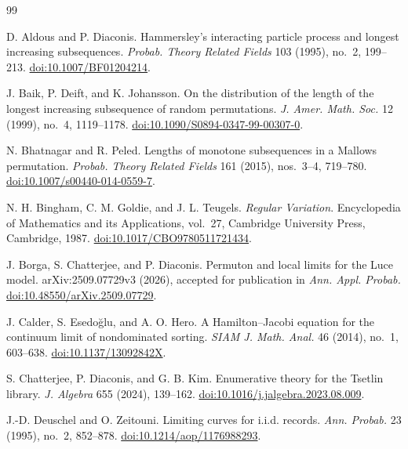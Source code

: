 \documentclass[11pt]{article}
\theoremstyle{remark}
\begin{document}
\begin{thebibliography}{99}

D. Aldous and P. Diaconis.
\newblock Hammersley's interacting particle process and longest increasing
subsequences.
\newblock \emph{Probab. Theory Related Fields} 103 (1995), no.~2, 199--213.
\newblock \href{https://doi.org/10.1007/BF01204214}{doi:10.1007/BF01204214}.

J. Baik, P. Deift, and K. Johansson.
\newblock On the distribution of the length of the longest increasing
subsequence of random permutations.
\newblock \emph{J. Amer. Math. Soc.} 12 (1999), no.~4, 1119--1178.
\newblock \href{https://doi.org/10.1090/S0894-0347-99-00307-0}
{doi:10.1090/S0894-0347-99-00307-0}.

N. Bhatnagar and R. Peled.
\newblock Lengths of monotone subsequences in a Mallows permutation.
\newblock \emph{Probab. Theory Related Fields} 161 (2015), nos.~3--4,
719--780.
\newblock \href{https://doi.org/10.1007/s00440-014-0559-7}
{doi:10.1007/s00440-014-0559-7}.

N. H. Bingham, C. M. Goldie, and J. L. Teugels.
\newblock \emph{Regular Variation}.
\newblock Encyclopedia of Mathematics and its Applications, vol.~27,
Cambridge University Press, Cambridge, 1987.
\newblock \href{https://doi.org/10.1017/CBO9780511721434}
{doi:10.1017/CBO9780511721434}.

J. Borga, S. Chatterjee, and P. Diaconis.
\newblock Permuton and local limits for the Luce model.
\newblock arXiv:2509.07729v3 (2026), accepted for publication in
\emph{Ann. Appl. Probab.}
\newblock \href{https://doi.org/10.48550/arXiv.2509.07729}
{doi:10.48550/arXiv.2509.07729}.

J. Calder, S. Esedo\u{g}lu, and A. O. Hero.
\newblock A Hamilton--Jacobi equation for the continuum limit of
nondominated sorting.
\newblock \emph{SIAM J. Math. Anal.} 46 (2014), no.~1, 603--638.
\newblock \href{https://doi.org/10.1137/13092842X}
{doi:10.1137/13092842X}.

S. Chatterjee, P. Diaconis, and G. B. Kim.
\newblock Enumerative theory for the Tsetlin library.
\newblock \emph{J. Algebra} 655 (2024), 139--162.
\newblock \href{https://doi.org/10.1016/j.jalgebra.2023.08.009}
{doi:10.1016/j.jalgebra.2023.08.009}.

J.-D. Deuschel and O. Zeitouni.
\newblock Limiting curves for i.i.d. records.
\newblock \emph{Ann. Probab.} 23 (1995), no.~2, 852--878.
\newblock \href{https://doi.org/10.1214/aop/1176988293}
{doi:10.1214/aop/1176988293}.


\end{thebibliography}
\end{document}
